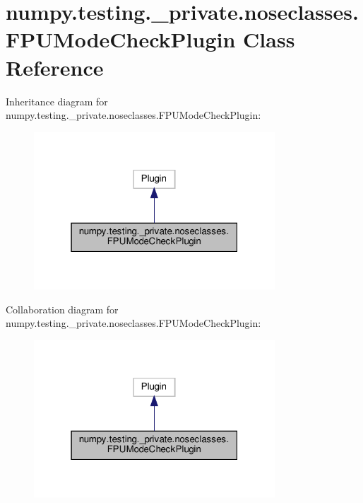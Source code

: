 \hypertarget{classnumpy_1_1testing_1_1__private_1_1noseclasses_1_1FPUModeCheckPlugin}{}\section{numpy.\+testing.\+\_\+private.\+noseclasses.\+F\+P\+U\+Mode\+Check\+Plugin Class Reference}
\label{classnumpy_1_1testing_1_1__private_1_1noseclasses_1_1FPUModeCheckPlugin}


Inheritance diagram for numpy.\+testing.\+\_\+private.\+noseclasses.\+F\+P\+U\+Mode\+Check\+Plugin\+:
\nopagebreak
\begin{figure}[H]
\begin{center}
\leavevmode
\includegraphics[width=256pt]{classnumpy_1_1testing_1_1__private_1_1noseclasses_1_1FPUModeCheckPlugin__inherit__graph}
\end{center}
\end{figure}


Collaboration diagram for numpy.\+testing.\+\_\+private.\+noseclasses.\+F\+P\+U\+Mode\+Check\+Plugin\+:
\nopagebreak
\begin{figure}[H]
\begin{center}
\leavevmode
\includegraphics[width=256pt]{classnumpy_1_1testing_1_1__private_1_1noseclasses_1_1FPUModeCheckPlugin__coll__graph}
\end{center}
\end{figure}
